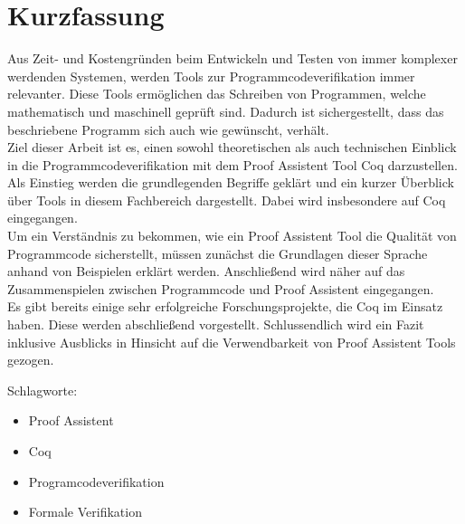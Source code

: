 \section*{Kurzfassung}
\thispagestyle{empty}


Aus Zeit- und Kostengründen beim Entwickeln und Testen von immer komplexer werdenden Systemen, werden Tools zur Programmcodeverifikation immer relevanter.
Diese Tools ermöglichen das Schreiben von Programmen, welche mathematisch und maschinell geprüft sind. Dadurch ist sichergestellt, dass das beschriebene Programm sich auch wie gewünscht, verhält.\\
Ziel dieser Arbeit ist es, einen sowohl theoretischen als auch technischen Einblick in die Programmcodeverifikation mit dem Proof Assistent Tool Coq darzustellen.
Als Einstieg werden die grundlegenden Begriffe geklärt und ein kurzer Überblick über Tools in diesem Fachbereich dargestellt. Dabei wird insbesondere auf Coq eingegangen.\\
Um ein Verständnis zu bekommen, wie ein Proof Assistent Tool die Qualität von Programmcode sicherstellt, müssen zunächst die Grundlagen dieser Sprache anhand von Beispielen erklärt werden. Anschließend wird näher auf das Zusammenspielen zwischen Programmcode und Proof Assistent eingegangen.\\
Es gibt bereits einige sehr erfolgreiche Forschungsprojekte, die Coq im Einsatz haben. Diese werden abschließend vorgestellt. Schlussendlich wird ein Fazit inklusive Ausblicks in Hinsicht auf die Verwendbarkeit von Proof Assistent Tools gezogen.
\bigskip

\noindent
Schlagworte:
\begin{itemize}
	\item Proof Assistent
	\item Coq
	\item Programcodeverifikation
	\item Formale Verifikation
\end{itemize}
